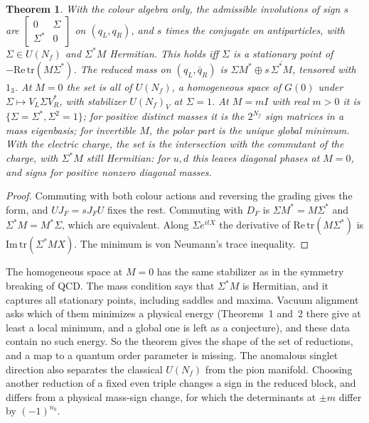 \documentclass[aps,prd,reprint,onecolumn,nofootinbib,amsmath,amssymb,floatfix]{revtex4-2}
\theoremstyle{plain}
\newtheorem{theorem}{Theorem}
\begin{document}
\begin{theorem}
With the colour algebra only, the admissible involutions of sign $s$ are $[\begin{smallmatrix}0&\Sigma\\ \Sigma^*&0\end{smallmatrix}]$ on $(q_L,q_R)$, and $s$ times the conjugate on antiparticles, with $\Sigma\in U(N_f)$ and $\Sigma^*M$ Hermitian. This holds iff $\Sigma$ is a stationary point of $-\mathrm{Re}\,\mathrm{tr}(M\Sigma^*)$. The reduced mass on $(q_L,\bar q_R)$ is $\Sigma M^*\oplus s\,\overline{\Sigma^*M}$, tensored with $1_3$. At $M=0$ the set is all of $U(N_f)$, a homogeneous space of $G(0)$ under $\Sigma\mapsto V_L\Sigma V_R^*$, with stabilizer $U(N_f)_V$ at $\Sigma=1$. At $M=mI$ with real $m>0$ it is $\{\Sigma=\Sigma^*,\Sigma^2=1\}$; for positive distinct masses it is the $2^{N_f}$ sign matrices in a mass eigenbasis; for invertible $M$, the polar part is the unique global minimum. With the electric charge, the set is the intersection with the commutant of the charge, with $\Sigma^*M$ still Hermitian: for $u,d$ this leaves diagonal phases at $M=0$, and signs for positive nonzero diagonal masses.
\end{theorem}

\begin{proof}
Commuting with both colour actions and reversing the grading gives the form, and $UJ_F=sJ_FU$ fixes the rest. Commuting with $D_F$ is $\Sigma M^*=M\Sigma^*$ and $\Sigma^*M=M^*\Sigma$, which are equivalent. Along $\Sigma e^{itX}$ the derivative of $\mathrm{Re}\,\mathrm{tr}(M\Sigma^*)$ is $\mathrm{Im}\,\mathrm{tr}(\Sigma^*MX)$. The minimum is von Neumann's trace inequality.
\end{proof}

The homogeneous space at $M=0$ has the same stabilizer as in the symmetry breaking of QCD. The mass condition says that $\Sigma^*M$ is Hermitian, and it captures all stationary points, including saddles and maxima. Vacuum alignment \cite{Dashen1971} asks which of them minimizes a physical energy (Theorems~1 and~2 there give at least a local minimum, and a global one is left as a conjecture), and these data contain no such energy. So the theorem gives the shape of the set of reductions, and a map to a quantum order parameter is missing. The anomalous singlet direction also separates the classical $U(N_f)$ from the pion manifold. Choosing another reduction of a fixed even triple changes a sign in the reduced block, and differs from a physical mass-sign change, for which the determinants at $\pm m$ differ by $(-1)^{n_0}$.
\end{document}
